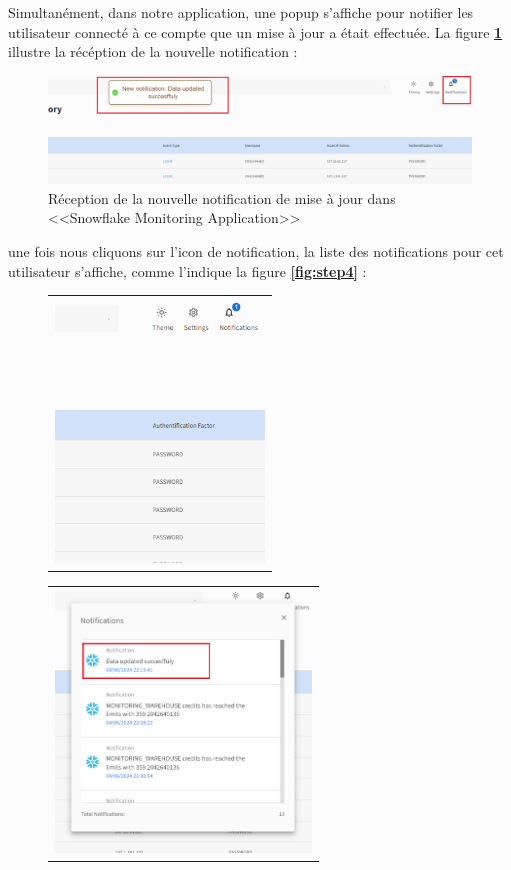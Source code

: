 \begin{itemize}
        \par Simultanément, dans notre application, une popup s'affiche pour notifier les utilisateur connecté à ce compte que un mise à jour a était effectuée.
        La figure \textbf{\ref{fig:step3}} illustre la récéption de la nouvelle notification : 
        \begin{figure}[H]
            \centering
            \includegraphics[width =1\linewidth]{img/captures/notifications/new_update.png}
            \caption{Réception de la nouvelle notification de mise à jour dans <<Snowflake Monitoring Application>>}
            \label{fig:step3}
        \end{figure}
        \par une fois nous cliquons sur l'icon de notification, la liste des notifications pour cet utilisateur s'affiche, comme l'indique la figure \textbf{\ref{fig:step4}} : 
        \begin{figure}[H]
            \centering
            \begin{tabular}[b]{c}
            \includegraphics[width=0.3\linewidth ,height=7cm]{img/captures/notifications/notif.png} \\
            
            \end{tabular} 
            \begin{tabular}[b]{c}
            \includegraphics[width=0.3\linewidth ,height=7cm]{img/captures/notifications/update2.png} \\
            

\end{tabular}
\end{figure}
\end{itemize}
